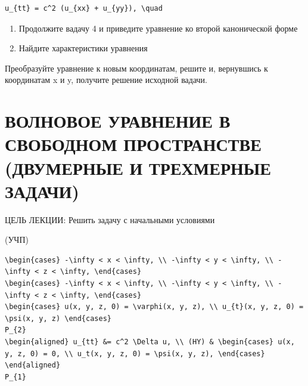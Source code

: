 \documentclass[
  ukrainian,
]{article}
\begin{document}
\begin{verbatim}
u_{tt} = c^2 (u_{xx} + u_{yy}), \quad
\end{verbatim}

\begin{enumerate}
\def\labelenumi{\arabic{enumi}.}
\setcounter{enumi}{4}
\item
  Продолжите вадачу 4 и приведите уравнение ко второй канонической форме
\item
  Найдите характеристики уравнения
\end{enumerate}

Преобразуйте уравнение к новым координатам, решите и, вернувшись к
координатам x и y, получите решение исходной вадачи.

\section{ВОЛНОВОЕ УРАВНЕНИЕ В СВОБОДНОМ ПРОСТРАНСТВЕ (ДВУМЕРНЫЕ И
ТРЕХМЕРНЫЕ
ЗАДАЧИ)}\label{ux432ux43eux43bux43dux43eux432ux43eux435-ux443ux440ux430ux432ux43dux435ux43dux438ux435-ux432-ux441ux432ux43eux431ux43eux434ux43dux43eux43c-ux43fux440ux43eux441ux442ux440ux430ux43dux441ux442ux432ux435-ux434ux432ux443ux43cux435ux440ux43dux44bux435-ux438-ux442ux440ux435ux445ux43cux435ux440ux43dux44bux435-ux437ux430ux434ux430ux447ux438}

ЦЕЛЬ ЛЕКЦИИ: Решить задачу с начальными условиями

(УЧП)

\begin{verbatim}
\begin{cases} -\infty < x < \infty, \\ -\infty < y < \infty, \\ -\infty < z < \infty, \end{cases}
\begin{cases} -\infty < x < \infty, \\ -\infty < y < \infty, \\ -\infty < z < \infty, \end{cases}
\begin{cases} u(x, y, z, 0) = \varphi(x, y, z), \\ u_{t}(x, y, z, 0) = \psi(x, y, z) \end{cases}
P_{2}
\begin{aligned} u_{tt} &= c^2 \Delta u, \\ (HY) & \begin{cases} u(x, y, z, 0) = 0, \\ u_t(x, y, z, 0) = \psi(x, y, z), \end{cases} \end{aligned}
P_{1}
\end{verbatim}
\end{document}
